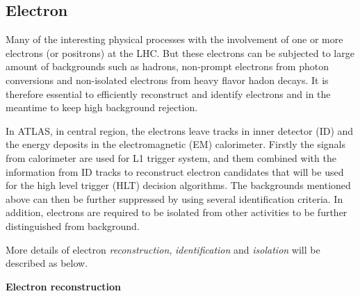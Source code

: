 \subsection{Electron}
\label{sec:electron}

Many of the interesting physical processes with the involvement of one or more electrons (or positrons) at the LHC.
But these electrons can be subjected to large amount of backgrounds such as hadrons, non-prompt electrons from photon conversions and non-isolated electrons from heavy flavor hadon decays.
It is therefore essential to efficiently reconstruct and identify electrons and in the meantime to keep high background rejection.

In ATLAS, in central region, the electrons leave tracks in inner detector (ID) and the energy deposits in the electromagnetic (EM) calorimeter. 
Firstly the signals from calorimeter are used for L1 trigger system, and them combined with the information from ID tracks to reconstruct electron candidates that will be used for the high level trigger (HLT) decision algorithms\cite{ATLAS-CONF-2016-024}.
The backgrounds mentioned above can then be further suppressed by using several identification criteria.
In addition, electrons are required to be isolated from other activities to be further distinguished from background.

More details of electron \textit{reconstruction}, \textit{identification} and \textit{isolation} will be described as below.

\textbf{Electron reconstruction} 

